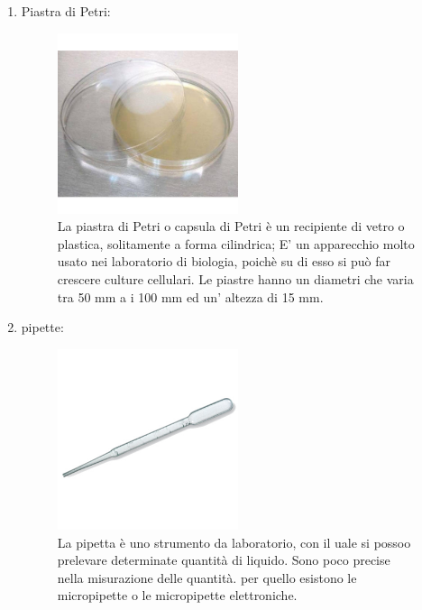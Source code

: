 \documentclass{article}
\begin{document}
\begin{enumerate}
\begin{figure}[H]
		\end{figure}

		\vspace{0.5cm}


		\item Piastra di Petri:

		\begin{figure}[H]

			\includegraphics[width=0.5\textwidth]{./immagini/piastra_petri.jpg}
			\caption{La piastra di Petri o capsula di Petri è un recipiente di vetro o plastica,  solitamente a forma cilindrica; E' un apparecchio molto usato nei laboratorio di biologia, poichè su di esso si può far crescere culture cellulari. Le piastre hanno un diametri che varia tra 50 mm a i 100 mm ed un' altezza di 15 mm.}
			\label{piastra_petri}

		\end{figure}

		\vspace{0.5cm}


		\item pipette:

		\begin{figure}[H]

			\includegraphics[width=0.5\textwidth]{./immagini/pipetta.jpg}
			\caption{La pipetta è uno strumento da laboratorio, con il uale si possoo prelevare determinate quantità di liquido. Sono poco precise nella misurazione delle quantità. per quello esistono le micropipette o le micropipette elettroniche.}
			\label{pipetta}


\end{figure}
\end{enumerate}
\end{document}
